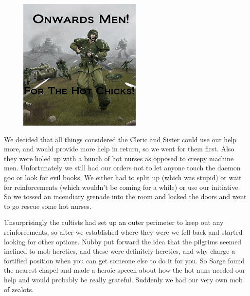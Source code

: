 \begin{figure}
	\begin{center}
		\includegraphics[width=\figwidth]{pics/2/11.png}
	\end{center}
\end{figure}
We decided that all things considered the Cleric and Sister could use our help more, and would provide more help in return, so we went for them first. 
Also they were holed up with a bunch of hot nurses as opposed to creepy machine men. 
Unfortunately we still had our orders not to let anyone touch the daemon goo or look for evil books. 
We either had to split up (which was stupid) or wait for reinforcements (which wouldn't be coming for a while) or use our initiative. 
So we tossed an incendiary grenade into the room and locked the doors and went to go rescue some hot nurses.

Unsurprisingly the cultists had set up an outer perimeter to keep out any reinforcements, so after we established where they were we fell back and started looking for other options. 
Nubby put forward the idea that the pilgrims seemed inclined to mob heretics, and these were definitely heretics, and why charge a fortified position when you can get someone else to do it for you. 
So Sarge found the nearest chapel and made a heroic speech about how the hot nuns needed our help and would probably be really grateful. 
Suddenly we had our very own mob of zealots. 

